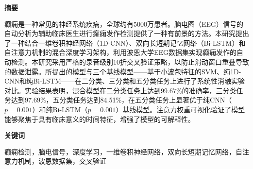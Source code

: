 \onehalfspacing
{}
{}
{\fontsize{16pt}{30pt}\selectfont \noindent\textbf{摘要}}
\vspace{0.5cm}
{\fontsize{12pt}{18pt}\selectfont

癫痫是一种常见的神经系统疾病，全球约有5000万患者。脑电图（EEG）信号的自动分析为辅助临床医生进行癫痫发作检测提供了一种有前景的方法。本研究提出了一种结合一维卷积神经网络（1D-CNN）、双向长短期记忆网络（Bi-LSTM）和自注意力机制的混合深度学习架构，利用波恩大学EEG数据集实现癫痫发作的自动检测。本研究采用严格的录音级别10折交叉验证策略，以防止滑动窗口重叠导致的数据泄露。所提出的模型与三个基线模型——基于小波包特征的SVM、纯1D-CNN和纯Bi-LSTM——在二分类、三分类和五分类任务上进行了系统性消融实验对比。实验结果表明，混合模型在二分类任务上达到99.67\%的准确率，三分类任务达到97.69\%，五分类任务达到84.51\%，在五分类任务上显著优于纯CNN（$p = 0.001$）和纯Bi-LSTM（$p = 0.001$）基线模型。注意力权重可视化验证了模型能够聚焦于具有临床意义的时间特征，增强了模型的可解释性。

}
\vspace{0.5cm}
{\fontsize{16pt}{30pt}\selectfont \noindent\textbf{关键词}}
\vspace{0.5cm}
{\fontsize{12pt}{18pt}\selectfont

癫痫检测，脑电信号，深度学习，一维卷积神经网络，双向长短期记忆网络，自注意力机制，波恩数据集，交叉验证

}
